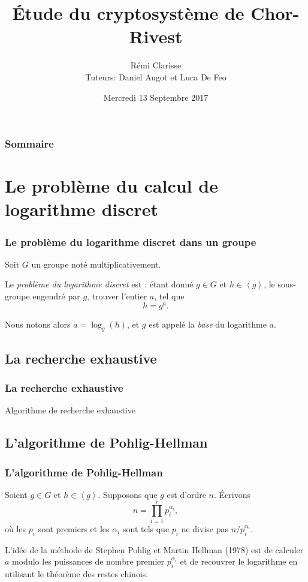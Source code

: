 \documentclass{beamer}
\title{Étude du cryptosystème de Chor-Rivest}
\author{Rémi {Clarisse} \\ Tuteurs: Daniel {Augot} et Luca {De Feo}}
\institute{ INRIA Saclay--Île-de-France \\ Université de Bordeaux}
\date{Mercredi 13 Septembre 2017}
\theoremstyle{definition}
\theoremstyle{remark}
\def\gen #1{\left\langle#1\right\rangle}
\begin{document}
\begin{frame}[plain]
	\titlepage
\end{frame}

\begin{frame}
	\frametitle{Sommaire}
  	\tableofcontents[hidesubsections]
\end{frame}

\section{Le problème du calcul de logarithme discret}
\begin{frame}
	\frametitle{Le problème du logarithme discret dans un groupe}
        Soit $G$ un groupe noté multiplicativement.

        Le \textit{problème du logarithme discret} est : étant donné $g\in G$ et $h \in \gen{g}$, le sous-groupe engendré par $g$, trouver l'entier $a$, tel que $$h=g^a.$$

        Nous notons alors $a=\log_g(h)$, et $g$ est appelé la \textit{base} du logarithme $a$.
\end{frame}

\subsection{La recherche exhaustive}
\begin{frame}
  \frametitle{La recherche exhaustive}
        \begin{algorithm}[H]
          \caption{Algorithme de recherche exhaustive}
          \label{algo:logDiscretNaif}
          \begin{algorithmic}[1]
            \REQUIRE{$g$ d'ordre $n$ et $h \in \gen{g}$}
            \ENDWHILE
          \end{algorithmic}
        \end{algorithm}
\end{frame}

\subsection{L'algorithme de Pohlig-Hellman}
\begin{frame}
	\frametitle{L'algorithme de Pohlig-Hellman}
        Soient $g\in G$ et $h \in \gen{g}$. Supposons que $g$ est d'ordre $n$. \'Ecrivons $$n = \prod_{i=1}^r p_i^{\alpha_i},$$ où les $p_i$ sont premiers et les $\alpha_i$ sont tels que $p_i$ ne divise pas $n/p_i^{\alpha_i}$.

        L'idée de la méthode de Stephen Pohlig et Martin Hellman (1978) est de calculer $a$ modulo les puissances de nombre premier $p_i^{\alpha_i}$ et de recouvrer le logarithme en utilisant le théorème des restes chinois.
\end{frame}
\end{document}

